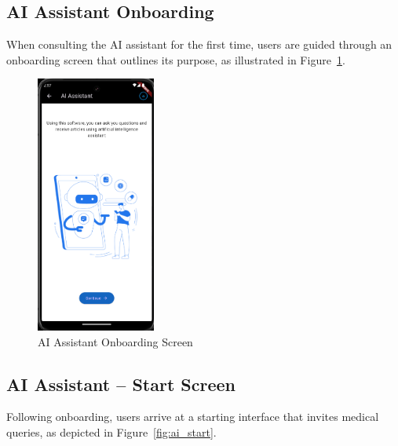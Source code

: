 \subsection{AI Assistant Onboarding}

When consulting the AI assistant for the first time, users are guided through an onboarding screen that outlines its purpose, as illustrated in Figure~\ref{fig:ai_onboarding}.

\begin{figure}[H]
    \centering
    \includegraphics[width=0.35\textwidth]{images/UI_Screenshots/on_boarding_ai_assistant_screen.png}
    \caption{AI Assistant Onboarding Screen}
    \label{fig:ai_onboarding}
\end{figure}

\subsection{AI Assistant – Start Screen}

Following onboarding, users arrive at a starting interface that invites medical queries, as depicted in Figure~\ref{fig:ai_start}.

